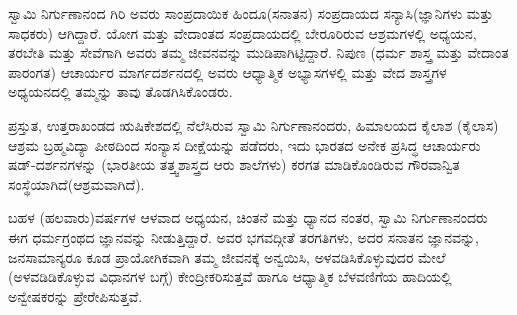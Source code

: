 ಸ್ವಾಮಿ ನಿರ್ಗುಣಾನಂದ ಗಿರಿ ಅವರು ಸಾಂಪ್ರದಾಯಿಕ ಹಿಂದೂ(ಸನಾತನ) ಸಂಪ್ರದಾಯದ ಸನ್ಯಾಸಿ(ಜ್ಞಾನಿಗಳು ಮತ್ತು ಸಾಧಕರು) ಆಗಿದ್ದಾರೆ. 
ಯೋಗ ಮತ್ತು ವೇದಾಂತದ ಸಂಪ್ರದಾಯದಲ್ಲಿ  ಬೇರೂರಿರುವ ಆಶ್ರಮಗಳಲ್ಲಿ ಅಧ್ಯಯನ, ತರಬೇತಿ ಮತ್ತು ಸೇವೆಗಾಗಿ ಅವರು ತಮ್ಮ ಜೀವನವನ್ನು ಮುಡಿಪಾಗಿಟ್ಟಿದ್ದಾರೆ. 
ನಿಪುಣ (ಧರ್ಮ ಶಾಸ್ತ್ರ ಮತ್ತು ವೇದಾಂತ ಪಾರಂಗತ)  ಆಚಾರ್ಯರ ಮಾರ್ಗದರ್ಶನದಲ್ಲಿ ಅವರು ಆಧ್ಯಾತ್ಮಿಕ ಅಭ್ಯಾಸಗಳಲ್ಲಿ ಮತ್ತು ವೇದ ಶಾಸ್ತ್ರಗಳ ಅಧ್ಯಯನದಲ್ಲಿ ತಮ್ಮನ್ನು ತಾವು ತೊಡಗಿಸಿಕೊಂಡರು.

ಪ್ರಸ್ತುತ, ಉತ್ತರಾಖಂಡದ ಋಷಿಕೇಶದಲ್ಲಿ ನೆಲೆಸಿರುವ ಸ್ವಾಮಿ ನಿರ್ಗುಣಾನಂದರು, ಹಿಮಾಲಯದ ಕೈಲಾಶ (ಕೈಲಾಸ) ಆಶ್ರಮ ಬ್ರಹ್ಮವಿದ್ಯಾ ಪೀಠದಿಂದ ಸಂನ್ಯಾಸ ದೀಕ್ಷೆಯನ್ನು ಪಡೆದರು, ಇದು ಭಾರತದ ಅನೇಕ ಪ್ರಸಿದ್ಧ ಆಚಾರ್ಯರು ಷಡ್-ದರ್ಶನಗಳನ್ನು (ಭಾರತೀಯ ತತ್ತ್ವಶಾಸ್ತ್ರದ ಆರು ಶಾಲೆಗಳು) ಕರಗತ ಮಾಡಿಕೊಂಡಿರುವ ಗೌರವಾನ್ವಿತ ಸಂಸ್ಥೆಯಾಗಿದೆ(ಆಶ್ರಮವಾಗಿದೆ).

ಬಹಳ (ಹಲವಾರು)ವರ್ಷಗಳ ಆಳವಾದ ಅಧ್ಯಯನ, ಚಿಂತನೆ ಮತ್ತು ಧ್ಯಾನದ ನಂತರ, ಸ್ವಾಮಿ ನಿರ್ಗುಣಾನಂದರು ಈಗ ಧರ್ಮಗ್ರಂಥದ ಜ್ಞಾನವನ್ನು ನೀಡುತ್ತಿದ್ದಾರೆ. 
ಅವರ ಭಗವದ್ಗೀತೆ ತರಗತಿಗಳು, ಅದರ ಸನಾತನ ಜ್ಞಾನವನ್ನು, ಜನಸಾಮಾನ್ಯರೂ ಕೂಡ ಪ್ರಾಯೋಗಿಕವಾಗಿ ತಮ್ಮ ಜೀವನಕ್ಕೆ ಅನ್ವಯಿಸಿ,  ಅಳವಡಿಸಿಕೊಳ್ಳುವುದರ  ಮೇಲೆ (ಅಳವಡಿಡಿಕೊಳ್ಳುವ ವಿಧಾನಗಳ ಬಗ್ಗೆ) ಕೇಂದ್ರೀಕರಿಸುತ್ತವೆ ಹಾಗೂ ಆಧ್ಯಾತ್ಮಿಕ ಬೆಳವಣಿಗೆಯ ಹಾದಿಯಲ್ಲಿ ಅನ್ವೇಷಕರನ್ನು ಪ್ರೇರೇಪಿಸುತ್ತವೆ.
